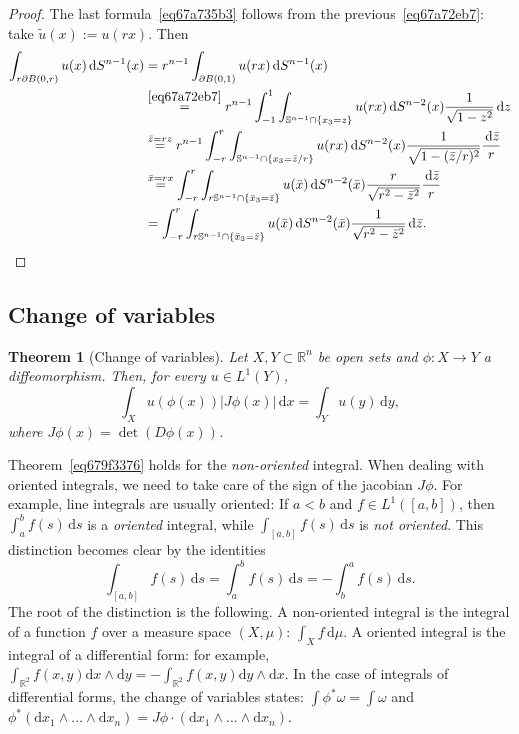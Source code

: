 \documentclass[a4paper,9pt]{amsart}
\newcommand{\bb}[1]{\mathbb{#1}}
\newcommand{\R}{\mathbb{R}}	%
\newcommand{\dd}{\mathrm{d}}	%
\newcommand{\did}{\,\mathrm{d}}	%
\newcommand{\de}{\partial}		%
\theoremstyle{plain}
\newtheorem{theorem}[proposition]{Theorem}
\theoremstyle{definition}
\theoremstyle{remark}
\begin{document}
\begin{proof}
	The last formula~\eqref{eq67a735b3} follows from the previous~\eqref{eq67a72eb7}:
	take $\tilde u(x):= u(rx)$. Then
	\begin{align*}
	\int_{r\de B(0,r)} u(x) \did S^{n-1}(x)
	&= r^{n-1}  \int_{\de B(0,1)} u(rx) \did S^{n-1}(x) \\
	&\overset{\eqref{eq67a72eb7}}= r^{n-1} \int_{-1}^1 \int_{\bb S^{n-1}\cap \{x_3=z\}} u(rx) \did S^{n-2}(x) \frac1{\sqrt{1-z^2}}\did z \\
	&\overset{\bar z=rz}= r^{n-1} \int_{-r}^r \int_{\bb S^{n-1}\cap \{x_3=\bar z/r\}} u(rx) \did S^{n-2}(x) \frac1{\sqrt{1-(\bar z/r)^2}} \frac{\did \bar z}{r} \\
	&\overset{\bar x = rx}= \int_{-r}^r \int_{r\bb S^{n-1}\cap \{\bar x_3=\bar z\}} u(\bar x) \did S^{n-2}(\bar x) \frac{r}{\sqrt{r^2-\bar z^2}} \frac{\did \bar z}{r} \\
	&= \int_{-r}^r \int_{r\bb S^{n-1}\cap \{\bar x_3=\bar z\}} u(\bar x) \did S^{n-2}(\bar x) \frac{1}{\sqrt{r^2-\bar z^2}} \did \bar z .
	\end{align*}
\end{proof}

\subsection{Change of variables}

\begin{theorem}[Change of variables]\label{thm679f367e}
	Let $X,Y\subset\R^n$ be open sets and $\phi:X\to Y$ a diffeomorphism.
	Then, for every $u\in L^1(Y)$,
	\begin{equation}\label{eq679f3376}
		\int_X u(\phi(x)) |J\phi(x)| \did x = \int_Y u(y) \did y ,
	\end{equation}
	where $J\phi(x) = \det(D\phi(x))$.
\end{theorem}

Theorem~\ref{eq679f3376} holds for the {\it non-oriented} integral. 
When dealing with oriented integrals, we need to take care of the sign of the jacobian $J\phi$.
For example, line integrals are usually oriented:
If $a<b$ and $f\in L^1([a,b])$,
then $\int_a^bf(s)\did s$ is a {\it oriented} integral, while $\int_{[a,b]}f(s)\did s$ is {\it not oriented}.
This distinction becomes clear by the identities
\begin{equation}\label{eq679f35fd}
	\int_{[a,b]} f(s) \did s = \int_a^b f(s) \did s =  - \int_b^a f(s) \did s .
\end{equation}
The root of the distinction is the following.
A non-oriented integral is the integral of a function $f$ over a measure space $(X,\mu)$:
$\int_X f \did\mu$. 
A oriented integral is the integral of a differential form:
for example, $\int_{\R^2} f(x,y) \dd x\wedge\dd y = - \int_{\R^2} f(x,y) \dd y\wedge\dd x$.
In the case of integrals of differential forms, the change of variables states:
$\int \phi^* \omega = \int \omega$
and $\phi^*(\dd x_1\wedge\dots\wedge\dd x_n) = J\phi\cdot (\dd x_1\wedge\dots\wedge\dd x_n)$.
\end{document}
